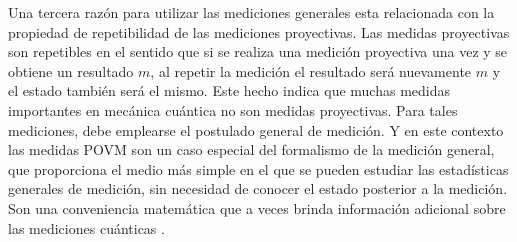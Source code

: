 Una tercera razón para utilizar las mediciones generales esta relacionada con la propiedad de repetibilidad de las mediciones proyectivas. Las medidas proyectivas son repetibles en el sentido que si se realiza una medición proyectiva una vez y se obtiene un resultado $m$, al repetir la medición el resultado será nuevamente $m$ y el estado también será el mismo. Este hecho indica que muchas medidas importantes en mecánica cuántica no son medidas proyectivas.  Para tales mediciones, debe emplearse el postulado general de medición. Y en este contexto las medidas POVM son un caso especial del formalismo de la medición general, que proporciona el medio más simple en el que se pueden estudiar las estadísticas generales de medición, sin necesidad de conocer el estado posterior a la medición. Son una conveniencia matemática que a veces brinda información adicional sobre las mediciones cuánticas {\cite{nielsen_chuang_2010}}.

